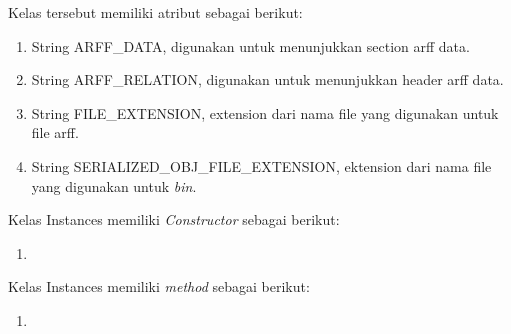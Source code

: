 Kelas tersebut memiliki atribut sebagai berikut:
\begin{enumerate}
	\item String ARFF\_DATA, digunakan untuk menunjukkan section arff data.
	\item String ARFF\_RELATION, digunakan untuk menunjukkan header arff data.
	\item String FILE\_EXTENSION, extension dari nama file yang digunakan untuk file arff.
	\item String SERIALIZED\_OBJ\_FILE\_EXTENSION, ektension dari nama file yang digunakan untuk \textsl{bin}.
\end{enumerate}

Kelas Instances memiliki \textsl{Constructor} sebagai berikut:
\begin{enumerate}
	\item 
\end{enumerate}

Kelas Instances memiliki \textsl{method} sebagai berikut:
\begin{enumerate}
	\item 
\end{enumerate}





















